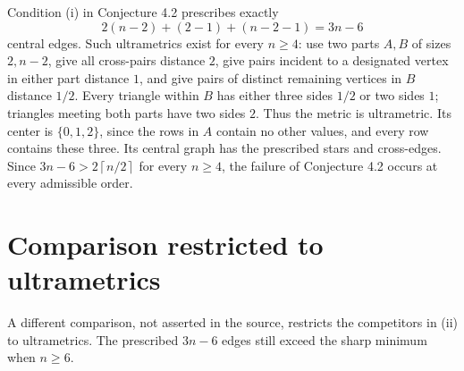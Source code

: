 \documentclass[11pt]{article}
\newcommand{\ceil}[1]{\left\lceil #1\right\rceil}
\begin{document}
Condition (i) in Conjecture 4.2 prescribes exactly
\begin{equation}\label{eq:old}
 2(n-2)+(2-1)+(n-2-1)=3n-6
\end{equation}
central edges. Such ultrametrics exist for every $n\ge4$: use two
parts $A,B$ of sizes $2,n-2$, give all cross-pairs distance $2$,
give pairs incident to a designated vertex in either part distance $1$,
and give pairs of distinct remaining vertices in $B$ distance $1/2$.
Every triangle within $B$ has either three sides $1/2$ or two sides
$1$; triangles meeting both parts have two sides $2$. Thus the metric
is ultrametric. Its center is $\{0,1,2\}$, since the rows in $A$
contain no other values, and every row contains these three.
Its central graph has the prescribed stars and cross-edges.
Since $3n-6>2\ceil{n/2}$ for every $n\ge4$, the failure of
Conjecture 4.2 occurs at every admissible order.

\section{Comparison restricted to ultrametrics}
A different comparison, not asserted in the source, restricts the
competitors in (ii) to ultrametrics. The prescribed $3n-6$ edges
still exceed the sharp minimum when $n\ge6$.
\end{document}
